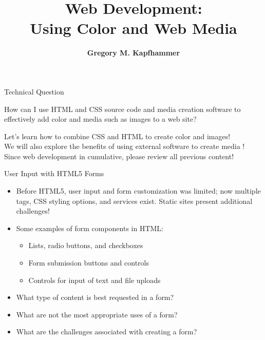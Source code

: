 \documentclass[14pt,aspectratio=169]{beamer}
\title{Web Development: \\ Using Color and Web Media}
\author{{\bf Gregory M. Kapfhammer}}
\institute[shortinst]{{\bf Department of Computer Science, Allegheny College}}
\begin{document}
{
  \begin{frame}
    \titlepage
  \end{frame}
}

%
\begin{frame}{Technical Question}
  \hspace*{.25in}
  \vspace*{.1in}
  \begin{minipage}{4.5in}
    \begin{center}
      {\large How can I use HTML and CSS source code and media creation software to
      effectively add color and media such as images to a web site?}
    \end{center}
  \end{minipage}
  \vspace{2ex}
  \begin{center}
    \small Let's learn how to combine CSS and HTML to create color and images!\\
    \small We will also explore the benefits of using external software to
    create media !\\
    \small Since web development in cumulative, please review all previous content!\\
  \end{center}
\end{frame}

%
\begin{frame}{User Input with HTML5 Forms}
  \begin{itemize}
    \item Before HTML5, user input and form customization was limited; now
      multiple tags, CSS styling options, and services exist. Static sites
      present additional challenges!
      \vspace*{-.15in}
    \item Some examples of form components in HTML:
      \begin{itemize}
        \item Lists, radio buttons, and checkboxes
        \item Form submission buttons and controls
        \item Controls for input of text and file uploads
      \end{itemize}
      \vspace*{-.2in}
    \item What type of content is best requested in a form?
      \vspace*{-.2in}
    \item What are not the most appropriate uses of a form?
      \vspace*{-.2in}
    \item What are the challenges associated with creating a form?
  \end{itemize}
\end{frame}
\end{document}

